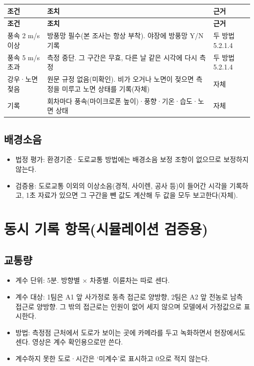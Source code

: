 \documentclass[10.5pt,a4paper]{article}
\newcommand{\hd}[1]{\cellcolor{headfill}\textbf{\sffamily #1}}
\begin{document}
\footnotesize
\begin{longtable}{>{\raggedright\arraybackslash}p{}>{\raggedright\arraybackslash}p{}>{\raggedright\arraybackslash}p{}}
\toprule
\hd{조건} & \hd{조치} & \hd{근거} \\ \midrule
\endfirsthead
\toprule
\hd{조건} & \hd{조치} & \hd{근거} \\ \midrule
\endhead
\bottomrule
\endlastfoot
풍속 2 m/s 이상 & 방풍망 필수(본 조사는 항상 부착). 야장에 방풍망 Y/N 기록 & 두 방법 5.2.1.4 \\ \midrule
풍속 5 m/s 초과 & 측정 중단. 그 구간은 무효, 다른 날 같은 시각에 다시 측정 & 두 방법 5.2.1.4 \\ \midrule
강우·노면 젖음 & 원문 규정 없음(미확인). 비가 오거나 노면이 젖으면 측정을 미루고 노면 상태를 기록(자체) & 자체 \\ \midrule
기록 & 회차마다 풍속(마이크로폰 높이)·풍향·기온·습도·노면 상태 & 자체 \\
\end{longtable}
\addtocounter{table}{-1}
\normalsize
{}\subsection{배경소음}
\begin{itemize}
\item 법정 평가: 환경기준·도로교통 방법에는 배경소음 보정 조항이 없으므로 보정하지 않는다.
\item 검증용: 도로교통 이외의 이상소음(경적, 사이렌, 공사 등)이 들어간 시각을 기록하고, 1초 자료가 있으면 그 구간을 뺀 값도 계산해 두 값을 모두 보고한다(자체).
\end{itemize}
\section{동시 기록 항목(시뮬레이션 검증용)}
\subsection{교통량}
\begin{itemize}
\item 계수 단위: 5분. 방향별 $\times$ 차종별. 이륜차는 따로 센다.
\item 계수 대상: 1팀은 A1 앞 사가정로 동측 접근로 양방향, 2팀은 A2 앞 전농로 남측 접근로 양방향. 그 밖의 접근로는 인원이 없어 세지 않으며 모델에서 가정값으로 표시한다.
\item 방법: 측정점 근처에서 도로가 보이는 곳에 카메라를 두고 녹화하면서 현장에서도 센다. 영상은 계수 확인용으로만 쓴다.
\item 계수하지 못한 도로·시간은 `미계수'로 표시하고 0으로 적지 않는다.
\end{itemize}
\end{document}
